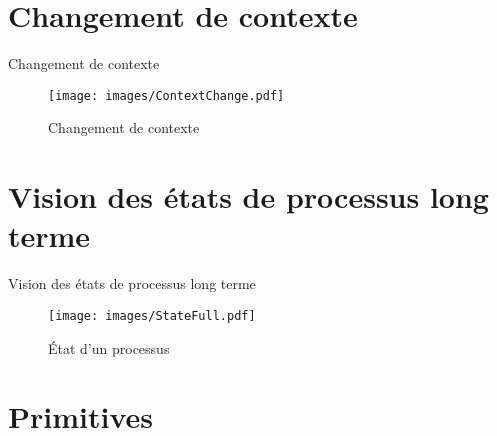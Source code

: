 
\def\sectitle{Changement de contexte}
\section{\sectitle}

\begin{frame}{\sectitle}
\begin{figure}
\texttt{[image: images/ContextChange.pdf]}
\caption{Changement de contexte}
\end{figure}
\end{frame}

\def\sectitle{Vision des états de processus long terme}
\section{\sectitle}
\begin{frame}{\sectitle}
\begin{figure}
\texttt{[image: images/StateFull.pdf]}
\caption{État d'un processus}
\end{figure}
\end{frame}



\def\sectitle{Primitives}
\section{\sectitle}

